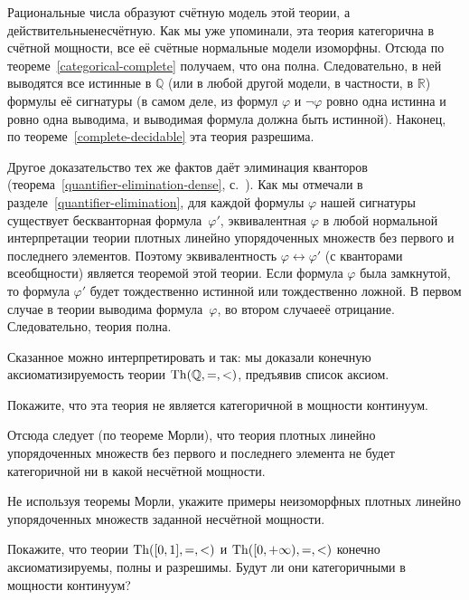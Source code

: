 Рациональные числа образуют счётную модель этой
теории, а действительные\т несчётную.
Как мы уже упоминали, эта теория категорична в счётной мощности,
все её счётные нормальные модели изоморфны. Отсюда по
теореме~\ref{categorical-complete} получаем, что она полна.
Следовательно, в ней выводятся все истинные в $\mathbb{Q}$ (или
в любой другой модели, в частности, в $\mathbb{R}$) формулы её
сигнатуры (в самом деле, из формул $\varphi$ и $\lnot\varphi$
ровно одна истинна и ровно одна выводима, и выводимая формула
должна быть истинной). Наконец, по
теореме~\ref{complete-decidable} эта теория разрешима.

Другое доказательство тех же фактов даёт элиминация кванторов%
(теорема~\ref{quantifier-elimination-dense},
с.~\pageref{quantifier-elimination-dense}). Как мы отмечали в
разделе~\ref{quantifier-elimination}, для каждой формулы
$\varphi$ нашей сигнатуры существует бескванторная
формула~$\varphi'$, эквивалентная $\varphi$ в любой нормальной
интерпретации теории плотных линейно упорядоченных множеств без
первого и последнего элементов. Поэтому эквивалентность
$\varphi\leftrightarrow\varphi'$ (с кванторами всеобщности)
является теоремой этой теории. Если формула $\varphi$ была
замкнутой, то формула $\varphi'$ будет тождественно истинной или
тождественно ложной. В первом случае в теории выводима
формула~$\varphi$, во втором случае\т её отрицание.
Следовательно, теория полна.

Сказанное можно интерпретировать и так: мы доказали конечную
аксиоматизируемость теории $\operatorname{Th}(\mathbb{Q},{=},{<})$,
предъявив список аксиом.

\begin{problem}
Покажите, что эта теория не является категоричной в мощности
континуум.
\end{problem}

Отсюда следует (по теореме Морли),%
%
что теория плотных линейно
упорядоченных множеств без первого и последнего элемента не
будет категоричной ни в какой несчётной мощности.

\begin{problem}
Не используя теоремы Морли, укажите примеры неизоморфных
плотных линейно упорядоченных множеств заданной несчётной
мощности.
\end{problem}

\begin{problem}
Покажите, что  теории $\operatorname{Th}([0,1],{=},{<})$ и
$\operatorname{Th}([0,+\infty),{=},{<})$ конечно аксиоматизируемы, полны и
разрешимы. Будут ли они категоричными в мощности континуум?
\end{problem}

